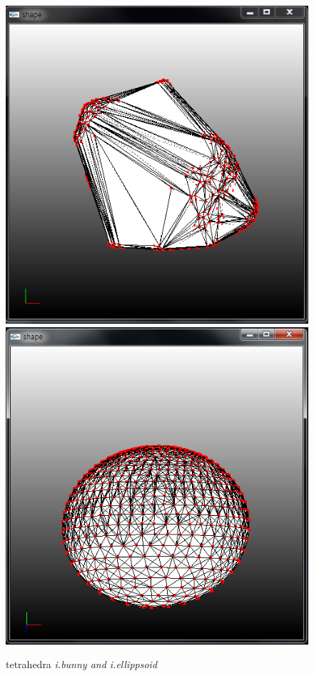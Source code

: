 \documentclass[11pt]{article}
\begin{document}
\begin{figure}[h]
\vspace{1cm}
\includegraphics[width=.5\textwidth]{FIGS/ibunny-tetra}
\hspace{1cm}
\includegraphics[width=.5\textwidth]{FIGS/iellipsoid-tetra}
\caption{tetrahedra \textit{i.bunny and i.ellippsoid}}
\end{figure}
\end{document}
